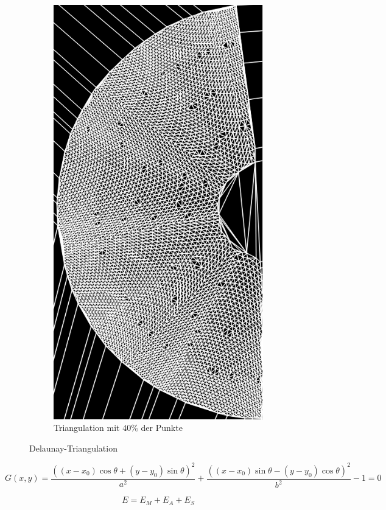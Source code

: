 \begin{figure}[!htb]
\begin{subfigure}{.9\textwidth}
		\includegraphics[angle=-90, width=.8\textwidth]{images/delaunay2.png}
		\caption{Triangulation mit $40\%$ der Punkte}
	\end{subfigure}
	\label{fig:delaunay}
	\caption{Delaunay-Triangulation}
\end{figure}

\begin{equation}
	G(x,y) = \frac{((x - x_0)\cos\theta + (y - y_0)\sin\theta)^2}{a^2} + \frac{((x - x_0)\sin\theta - (y - y_0)\cos\theta)^2}{b^2} - 1 = 0
\end{equation}

\begin{equation}
	E = E_M + E_A + E_S
\end{equation}

